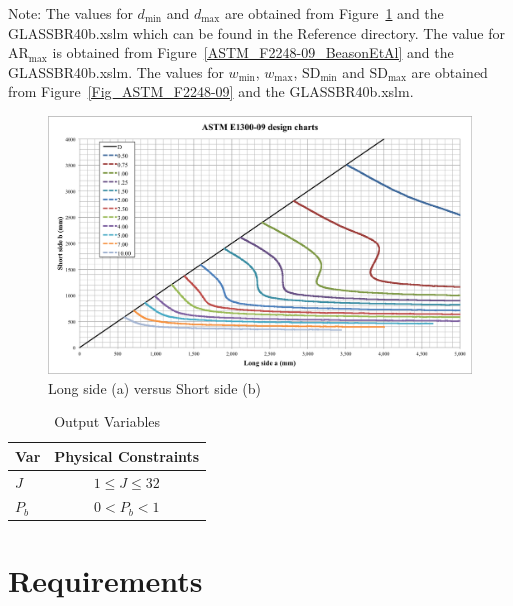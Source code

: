 \documentclass[12pt]{article}
\begin{document}
Note: The values for $d_\text{min}$ and $d_\text{max}$ are obtained from Figure~\ref{Fig_ASTM_E1300-09}
and the GLASS\textunderscore BR\textunderscore 40b.xslm which can be found in the 
Reference directory. The value for $\mbox{AR}_\text{max}$ is obtained from Figure~\ref{ASTM_F2248-09_BeasonEtAl}
and the GLASS\textunderscore BR\textunderscore 40b.xslm.
The values for $w_\text{min}$, $w_\text{max}$, $\text{SD}_\text{min}$ and $\text{SD}_\text{max}$
are obtained from Figure~\ref{Fig_ASTM_F2248-09} and the GLASS\textunderscore BR\textunderscore 40b.xslm. 
\newline

\begin{figure}[h!]
  \begin{center}
    \includegraphics[width=\textwidth]{ASTM_E1300-09_design_charts.png}
    \caption{Long side (a) versus Short side (b)}
    \label{Fig_ASTM_E1300-09}
  \end{center}
\end{figure}

\begin{table}[!h]
\caption{Output Variables} \label{TblOutputVar}
\renewcommand{\arraystretch}{1.2}
\begin{center}
\begin{tabular}{l c} 
\toprule
\textbf{Var} & \textbf{Physical Constraints} \\
\midrule 
$J$&$1 \leq J \leq 32$\\
$P_b$ & $0 < P_b < 1$\\
\bottomrule
\end{tabular}
\end{center}
\end{table}
  
\section{Requirements}  
\end{document}
